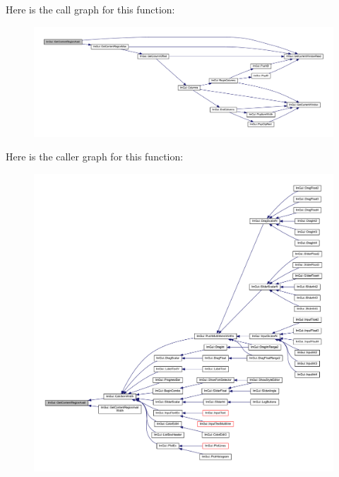 Here is the call graph for this function\+:
\nopagebreak
\begin{figure}[H]
\begin{center}
\leavevmode
\includegraphics[width=350pt]{namespace_im_gui_a410c8e19b2fea8b52746ca11b3930301_cgraph}
\end{center}
\end{figure}
Here is the caller graph for this function\+:
\nopagebreak
\begin{figure}[H]
\begin{center}
\leavevmode
\includegraphics[width=350pt]{namespace_im_gui_a410c8e19b2fea8b52746ca11b3930301_icgraph}
\end{center}
\end{figure}
\mbox{\label{namespace_im_gui_a52e3311f46626a5d0369139d20da993a}} 
